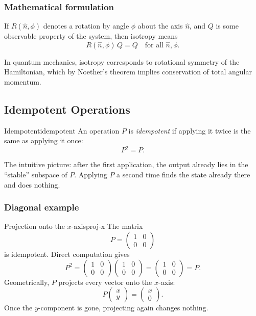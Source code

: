 \documentclass[11pt,a4paper]{article}
\begin{document}
\subsubsection{Mathematical formulation}

If $R(\hat{n},\phi)$ denotes a rotation by angle $\phi$ about the axis
$\hat{n}$, and $Q$ is some observable property of the system, then isotropy
means
\[
  R(\hat{n},\phi)\,Q = Q \quad\text{for all } \hat{n},\phi.
\]

In quantum mechanics, isotropy corresponds to rotational symmetry of the
Hamiltonian, which by Noether's theorem implies conservation of total angular
momentum.

\subsection{Idempotent Operations}
\label{sec:idempotent}

\begin{defn}{Idempotent}{idempotent}
  An operation $P$ is \emph{idempotent} if applying it twice is the same as
  applying it once:
  \[
    P^2 = P.
  \]
\end{defn}

The intuitive picture: after the first application, the output already lies in
the ``stable'' subspace of $P$.  Applying $P$ a second time finds the state
already there and does nothing.

\subsubsection{Diagonal example}

\begin{exm}{Projection onto the $x$-axis}{proj-x}
  The matrix
  \[
    P = \begin{pmatrix}1&0\\0&0\end{pmatrix}
  \]
  is idempotent.  Direct computation gives
  \[
    P^2 =
    \begin{pmatrix}1&0\\0&0\end{pmatrix}
    \begin{pmatrix}1&0\\0&0\end{pmatrix}
    =
    \begin{pmatrix}1&0\\0&0\end{pmatrix} = P.
  \]
  Geometrically, $P$ projects every vector onto the $x$-axis:
  \[
    P\begin{pmatrix}x\\y\end{pmatrix} = \begin{pmatrix}x\\0\end{pmatrix}.
  \]
  Once the $y$-component is gone, projecting again changes nothing.
\end{exm}
\end{document}
